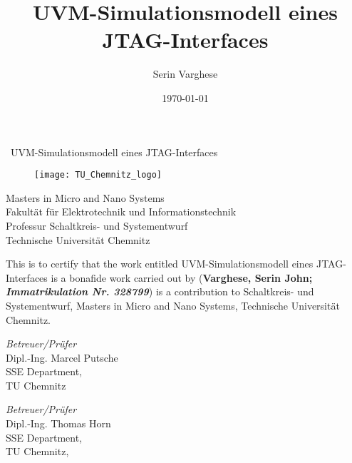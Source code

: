 \documentclass[a4paper,11pt]{article}
\title{\Huge{UVM-Simulationsmodell eines JTAG-Interfaces}}
\date{\today}
\author{Serin Varghese}
\begin{document}
\maketitle
\pagebreak

\newlength{\toptafiddle} 
\newlength{\bottafiddle}
\setlength{\toptafiddle}{1in}
\setlength{\bottafiddle}{1in}
\vspace*{-0.5in}
\enlargethispage{\bottafiddle}
\thispagestyle{empty}

\graphicspath{{./images/}}

\begin{center}
\ UVM-Simulationsmodell eines JTAG-Interfaces \\
\vspace{0.2cm}

\begin{figure}[!h]
\centering
\texttt{[image: TU\_Chemnitz\_logo]}
\end{figure}

Masters in Micro and Nano Systems\\
Fakultät für Elektrotechnik und Informationstechnik\\
Professur Schaltkreis- und Systementwurf\\
Technische Universität Chemnitz\\
\end{center}

This is to certify that the work entitled \textgravedbl UVM-Simulationsmodell eines JTAG-Interfaces \textacutedbl is a bonafide work carried out by 
(\textbf{Varghese, Serin John; \textit{Immatrikulation Nr. 328799}})
is a contribution to Schaltkreis- und Systementwurf, Masters in Micro and Nano
Systems, Technische Universität Chemnitz.

\vfill
\begin{minipage}[t]{0.5\textwidth}%
\emph{Betreuer/Prüfer}\\
Dipl.-Ing. Marcel Putsche\\
SSE Department,\\
TU Chemnitz
\end{minipage}\hspace{0.5cm}
\begin{minipage}[t]{0.5\textwidth}%
\emph{Betreuer/Prüfer}\\
Dipl.-Ing. Thomas Horn\\
SSE Department,\\
TU Chemnitz, \\


\end{minipage}\vfill
\vfill
\end{document}
